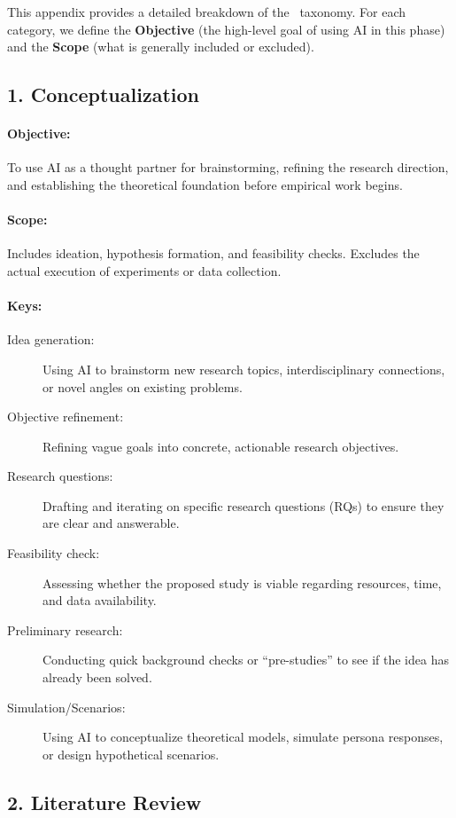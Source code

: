 \documentclass[11pt]{article}
\begin{document}
This appendix provides a detailed breakdown of the \AIDpackageName\ taxonomy.
For each category, we define the \textbf{Objective} (the high-level goal of using AI in this phase) and the \textbf{Scope} (what is generally included or excluded).

\subsection*{1. Conceptualization}
\paragraph{Objective:} To use AI as a thought partner for brainstorming, refining the research direction, and establishing the theoretical foundation before empirical work begins.
\paragraph{Scope:} Includes ideation, hypothesis formation, and feasibility checks. Excludes the actual execution of experiments or data collection.
\paragraph{Keys:}
\begin{description}
    \item[Idea generation:] Using AI to brainstorm new research topics, interdisciplinary connections, or novel angles on existing problems.
    \item[Objective refinement:] Refining vague goals into concrete, actionable research objectives.
    \item[Research questions:] Drafting and iterating on specific research questions (RQs) to ensure they are clear and answerable.
    \item[Feasibility check:] Assessing whether the proposed study is viable regarding resources, time, and data availability.
    \item[Preliminary research:] Conducting quick background checks or “pre-studies” to see if the idea has already been solved.
    \item[Simulation/Scenarios:] Using AI to conceptualize theoretical models, simulate persona responses, or design hypothetical scenarios.
\end{description}

\subsection*{2. Literature Review}
\end{document}
